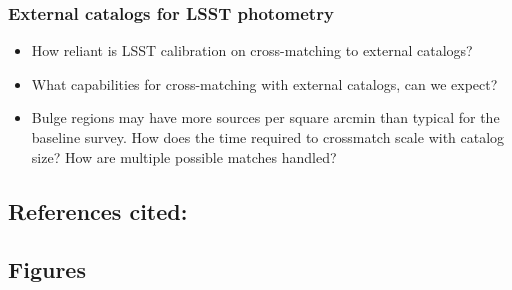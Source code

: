 \subsubsection{External catalogs for LSST photometry }
\begin{itemize}
\item How reliant is LSST calibration on cross-matching to external catalogs? 
\item What capabilities for cross-matching with external catalogs, can we expect? 
\item{ Bulge regions may have more sources per square arcmin than typical for the baseline survey. How does 
the time required to crossmatch scale with catalog size? How are multiple possible matches handled? }
\end{itemize}

\subsection{References cited: }

\subsection{Figures }


